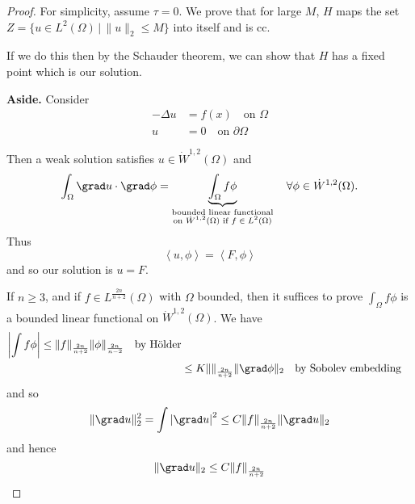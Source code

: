 \documentclass[10pt, oneside, reqno]{amsart}
\theoremstyle{plain}%
\numberwithin{equation}{section}
\theoremstyle{definition}
\theoremstyle{remark}
\newcommand{\given}{ \, | \,}
\newcommand{\iprod}[1]{\left\langle #1 \right\rangle}
\begin{document}
\begin{proof}
    For simplicity, assume $\tau = 0$.  We prove that for large $M$, $H$ maps the set $ Z = \{ u \in L^2(\Omega) \given \| u \|_2 \leq M \}$ into itself and is cc.  
    
    If we do this then by the Schauder theorem, we can show that $H$ has a fixed point which is our solution.
    
    \textbf{Aside.}  Consider \begin{align*}
        -\Delta u &= f(x) \quad \text{on $\Omega$} \\
        u &= 0 \quad \text{on $\partial \Omega$}
    \end{align*}
    
    Then a weak solution satisfies $u \in \dot W^{1, 2}(\Omega)$ and \[
        \int_\Omega \grad u \cdot \grad \phi = \underbrace{\int_\Omega f \phi}_{\substack{\text{bounded linear functional} \\ \text{on $\dot W^{1,2}(\Omega)$ if $f \in L^2(\Omega)$}}} \quad \forall \phi \in \dot W^{1, 2}(\Omega).
    \]  Thus \[
        \iprod{u, \phi} = \iprod{F, \phi}
    \] and so our solution is $u = F$.
    
      If $n \geq 3$, and if $f \in L^{\frac{2n}{n+2}}(\Omega)$ with $\Omega$ bounded, then it suffices to prove $\int_\Omega f \phi$ is a bounded linear functional on $\dot W^{1,2}(\Omega)$.  We have \begin{align*}
        \left| \int f \phi \right| \leq \| f \|_{\frac{2n}{n+2}} \| \phi \|_{\frac{2n}{n-2}} \quad \text{by H\"older} \\
    &\leq K \|  \|_{\frac{2n}{n+2}} \| \grad \phi \|_2 \quad \text{by Sobolev embedding}
      \end{align*} and so \begin{align*}
      \| \grad u \|_2^2 =   \int \left| \grad u \right|^2 \leq C \| f \|_{\frac{2n}{n+2}} \| \grad u \|_2
      \end{align*} and hence \[
        \| \grad u \|_2 \leq C \| f \|_{\frac{2n}{n+2}}
      \]
    

\end{proof}
\end{document}
